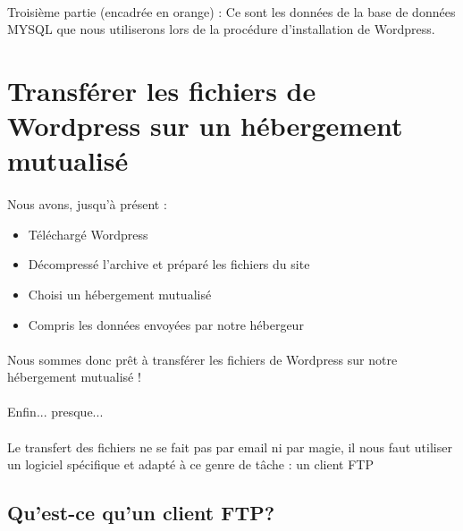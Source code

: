 \documentclass[10pt,a4paper]{article}
\begin{document}
\paragraph{}Troisième partie (encadrée en orange) : Ce sont les données de la base de données MYSQL que nous utiliserons lors de la procédure d'installation de Wordpress.
\newpage

\section{Transférer les fichiers de Wordpress sur un hébergement mutualisé}
\paragraph{}Nous avons, jusqu'à présent :
\begin{itemize}
\item Téléchargé Wordpress
\item Décompressé l'archive et préparé les fichiers du site
\item Choisi un hébergement mutualisé
\item Compris les données envoyées par notre hébergeur
\end{itemize}
\paragraph{}Nous sommes donc prêt à transférer les fichiers de Wordpress sur notre hébergement mutualisé !
\paragraph{}Enfin... presque...
\paragraph{}Le transfert des fichiers ne se fait pas par email ni par magie, il nous faut utiliser un logiciel spécifique et adapté à ce genre de tâche : un client FTP

\subsection{Qu'est-ce qu'un client FTP?}
\end{document}
